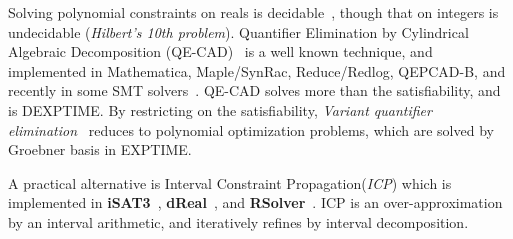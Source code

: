\documentclass[runningheads,a4paper,oribibl]{llncs}
\begin{document}
Solving polynomial constraints on reals is decidable~\cite{tarski}, 
though that on integers is undecidable ({\em Hilbert's 10th problem}). 
Quantifier Elimination by Cylindrical Algebraic Decomposition (QE-CAD)~\cite{qecad} 
is a well known technique, and 
implemented in Mathematica, Maple/SynRac, Reduce/Redlog, QEPCAD-B, and recently 
in some SMT solvers~\cite{Jovanovic13,smtrat}.   %
QE-CAD solves more than the satisfiability, and is DEXPTIME. %
By restricting on the satisfiability, {\em Variant quantifier elimination}~\cite{Hong2012883} reduces to 
polynomial optimization problems, which are solved by Groebner basis in EXPTIME. 

A practical alternative is Interval Constraint Propagation({\em ICP})\cite{benhamou:hal-00480814}
which is implemented in {\bf iSAT3}~\cite{isat}, {\bf dReal}~\cite{dRealCADE13}, and \textbf{RSolver}~\cite{rsolver}. 
ICP is an over-approximation by an interval arithmetic, and iteratively refines by
interval decomposition.

\end{document}
